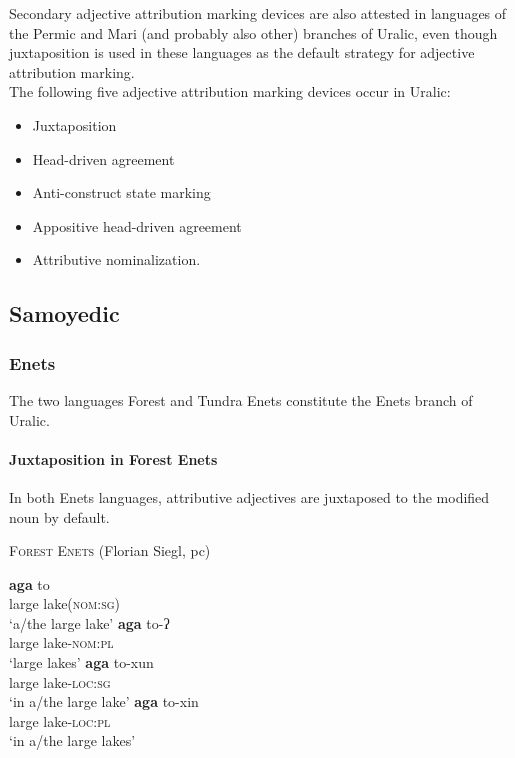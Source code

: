 Secondary adjective attribution marking devices are also attested in languages of the Permic and Mari (and probably also other) branches of Uralic, even though juxtaposition is used in these languages as the default strategy for adjective attribution marking.\\

\noindent The following five adjective attribution marking devices occur in Uralic:
\begin{itemize}
\item Juxtaposition
\item Head-driven agreement
\item Anti-construct state marking
\item Appositive head-driven agreement
\item Attributive nominalization.
\end{itemize}

\subsection{Samoyedic}

\subsubsection{Enets}
The two languages Forest and Tundra Enets constitute the Enets branch of Uralic.

\paragraph{Juxtaposition in Forest Enets}
In both Enets languages, attributive adjectives are juxtaposed to the modified noun by default.

\begin{exe}
\ex \textsc{Forest Enets} (Florian Siegl, pc) \label{enets juxt}
\begin{xlist}
\ex 
\gll	\textbf{aga} to\\
	large lake(\textsc{nom:sg})\\
\glt	‘a/the large lake’
\ex 
\gll	\textbf{aga} to-ʔ\\
	large lake\textsc{-nom:pl}\\
\glt	‘large lakes’
\ex 
\gll	\textbf{aga} to-xun\\
	large lake\textsc{-loc:sg}\\
\glt	‘in a/the large lake’
\ex 
\gll	\textbf{aga} to-xin\\
	large lake\textsc{-loc:pl}\\
\glt	‘in a/the large lakes’
\end{xlist}
\end{exe}

